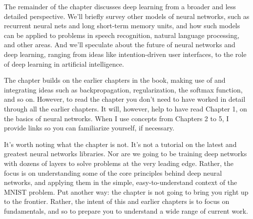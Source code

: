 \documentclass[a4paper,twoside,10pt]{book}
\begin{document}
The remainder of the chapter discusses deep learning from a broader and less detailed perspective. We'll briefly survey other models of neural networks, such as recurrent neural nets and long short-term memory units, and how such models can be applied to problems in speech recognition, natural language processing, and other areas. And we'll speculate about the future of neural networks and deep learning, ranging from ideas like intention-driven user interfaces, to the role of deep learning in artificial intelligence.

The chapter builds on the earlier chapters in the book, making use of and integrating ideas such as backpropagation, regularization, the softmax function, and so on. However, to read the chapter you don't need to have worked in detail through all the earlier chapters. It will, however, help to have read Chapter 1, on the basics of neural networks. When I use concepts from Chapters 2 to 5, I provide links so you can familiarize yourself, if necessary.

It's worth noting what the chapter is not. It's not a tutorial on the latest and greatest neural networks libraries. Nor are we going to be training deep networks with dozens of layers to solve problems at the very leading edge. Rather, the focus is on understanding some of the core principles behind deep neural networks, and applying them in the simple, easy-to-understand context of the MNIST problem. Put another way: the chapter is not going to bring you right up to the frontier. Rather, the intent of this and earlier chapters is to focus on fundamentals, and so to prepare you to understand a wide range of current work.
\end{document}
